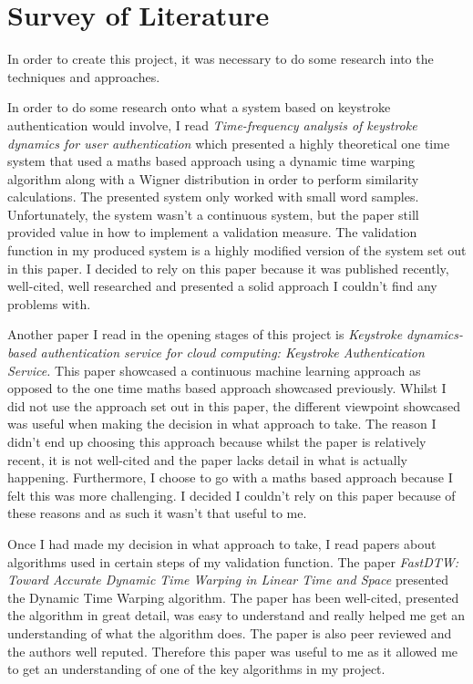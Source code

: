 \documentclass[10pt,a4paper]{report}
\begin{document}
\chapter{Survey of Literature}

In order to create this project, it was necessary to do some research into the techniques and approaches. 

In order to do some research onto what a system based on keystroke authentication would involve, I read \emph{Time-frequency analysis of keystroke dynamics for user authentication}\cite{ToosiRamin2021Taok} which presented a highly theoretical one time system that used a maths based approach using a dynamic time warping algorithm along with a Wigner distribution in order to perform similarity calculations. The presented system only worked with small word samples. Unfortunately, the system wasn't a continuous system, but the paper still provided value in how to implement a validation measure. The validation function in my produced system is a highly modified version of the system set out in this paper. I decided to rely on this paper because it was published recently, well-cited, well researched and presented a solid approach I couldn't find any problems with.

Another paper I read in the opening stages of this project is \emph{Keystroke dynamics-based authentication service for cloud computing: Keystroke Authentication Service.}\cite{cloudComp} This paper showcased a continuous machine learning approach as opposed to the one time maths based approach showcased previously. Whilst I did not use the approach set out in this paper, the different viewpoint showcased was useful when making the decision in what approach to take. The reason I didn't end up choosing this approach because whilst the paper is relatively recent, it is not well-cited and the paper lacks detail in what is actually happening. Furthermore, I choose to go with a maths based approach because I felt this was more challenging. I decided I couldn't rely on this paper because of these reasons and as such it wasn't that useful to me.

Once I had made my decision in what approach to take, I read papers about algorithms used in certain steps of my validation function. The paper \emph{FastDTW: Toward Accurate Dynamic Time Warping in Linear Time and Space}\cite{Salvador2004FastDTWTA} presented the Dynamic Time Warping algorithm. The paper has been well-cited, presented the algorithm in great detail, was easy to understand and really helped me get an understanding of what the algorithm does. The paper is also peer reviewed and the authors well reputed. Therefore this paper was useful to me as it allowed me to get an understanding of one of the key algorithms in my project.
\end{document}
